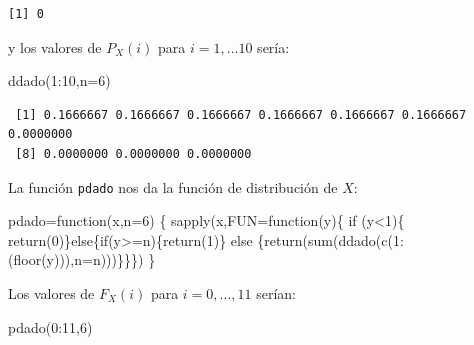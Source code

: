 \documentclass[
  letterpaper,
  DIV=11,
  numbers=noendperiod]{scrreprt}
\newenvironment{Shaded}{\begin{snugshade}}{\end{snugshade}}
\newcommand{\AttributeTok}[1]{\textcolor[rgb]{0.40,0.45,0.13}{#1}}
\newcommand{\ControlFlowTok}[1]{\textcolor[rgb]{0.00,0.23,0.31}{#1}}
\newcommand{\DecValTok}[1]{\textcolor[rgb]{0.68,0.00,0.00}{#1}}
\newcommand{\FunctionTok}[1]{\textcolor[rgb]{0.28,0.35,0.67}{#1}}
\newcommand{\NormalTok}[1]{\textcolor[rgb]{0.00,0.23,0.31}{#1}}
\newcommand{\OtherTok}[1]{\textcolor[rgb]{0.00,0.23,0.31}{#1}}
\newcommand{\SpecialCharTok}[1]{\textcolor[rgb]{0.37,0.37,0.37}{#1}}
\begin{document}
\begin{verbatim}
[1] 0
\end{verbatim}

y los valores de \(P_X(i)\) para \(i=1,\ldots 10\) sería:

\begin{Shaded}
\begin{Highlighting}[]
\FunctionTok{ddado}\NormalTok{(}\DecValTok{1}\SpecialCharTok{:}\DecValTok{10}\NormalTok{,}\AttributeTok{n=}\DecValTok{6}\NormalTok{)}
\end{Highlighting}
\end{Shaded}

\begin{verbatim}
 [1] 0.1666667 0.1666667 0.1666667 0.1666667 0.1666667 0.1666667 0.0000000
 [8] 0.0000000 0.0000000 0.0000000
\end{verbatim}

La función \texttt{pdado} nos da la función de distribución de \(X\):

\begin{Shaded}
\begin{Highlighting}[]
\NormalTok{pdado}\OtherTok{=}\ControlFlowTok{function}\NormalTok{(x,}\AttributeTok{n=}\DecValTok{6}\NormalTok{) }
\NormalTok{  \{}
  \FunctionTok{sapply}\NormalTok{(x,}\AttributeTok{FUN=}\ControlFlowTok{function}\NormalTok{(y)\{ }\ControlFlowTok{if}\NormalTok{ (y}\SpecialCharTok{\textless{}}\DecValTok{1}\NormalTok{)\{ }\FunctionTok{return}\NormalTok{(}\DecValTok{0}\NormalTok{)\}}\ControlFlowTok{else}\NormalTok{\{}\ControlFlowTok{if}\NormalTok{(y}\SpecialCharTok{\textgreater{}=}\NormalTok{n)\{}\FunctionTok{return}\NormalTok{(}\DecValTok{1}\NormalTok{)\} }\ControlFlowTok{else}
\NormalTok{  \{}\FunctionTok{return}\NormalTok{(}\FunctionTok{sum}\NormalTok{(}\FunctionTok{ddado}\NormalTok{(}\FunctionTok{c}\NormalTok{(}\DecValTok{1}\SpecialCharTok{:}\NormalTok{(}\FunctionTok{floor}\NormalTok{(y))),}\AttributeTok{n=}\NormalTok{n)))\}\}\})}
\NormalTok{  \}}
\end{Highlighting}
\end{Shaded}

Los valores de \(F_X(i)\) para \(i=0,\ldots, 11\) serían:

\begin{Shaded}
\begin{Highlighting}[]
\FunctionTok{pdado}\NormalTok{(}\DecValTok{0}\SpecialCharTok{:}\DecValTok{11}\NormalTok{,}\DecValTok{6}\NormalTok{)}
\end{Highlighting}
\end{Shaded}
\end{document}
